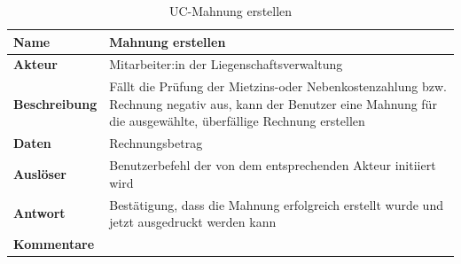 \vspace*{-0.8cm}
\begin{table}[H]
  \centering
  \settowidth{}
  \setlength\extrarowheight{2pt}
  \begin{tabulary}{1.0\textwidth}{|a|m{14cm}|}
    \hline
    \textbf{Name}& Mahnung erstellen\\
    \hline
    \textbf{Akteur}& Mitarbeiter:in der Liegenschaftsverwaltung\\
    \hline 
    \textbf{Beschreibung} & Fällt die Prüfung der Mietzins-oder Nebenkostenzahlung bzw. Rechnung negativ aus, kann der Benutzer eine Mahnung für die ausgewählte, überfällige Rechnung erstellen \\
    \hline
    \textbf{Daten} & Rechnungsbetrag\\
    \hline
    \textbf{Auslöser} & Benutzerbefehl der von dem entsprechenden Akteur initiiert wird\\
    \hline
    \textbf{Antwort} & Bestätigung, dass die Mahnung erfolgreich erstellt wurde und jetzt ausgedruckt werden kann\\
    \hline
    \textbf{Kommentare} & \\
    \hline
  \end{tabulary}
  \caption{UC-Mahnung erstellen}
\end{table}

